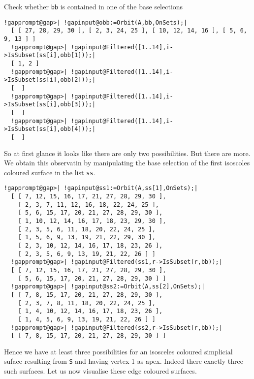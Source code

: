 \documentclass[a4paper,11pt]{report}
\begin{document}
{{ Check whether \texttt{bb} is contained in one of the base selections 

 
\begin{Verbatim}[commandchars=!@|,fontsize=\small,frame=single,label=Example]
  !gapprompt@gap>| !gapinput@obb:=Orbit(A,bb,OnSets);|
  [ [ 27, 28, 29, 30 ], [ 2, 3, 24, 25 ], [ 10, 12, 14, 16 ], [ 5, 6, 9, 13 ] ]
  !gapprompt@gap>| !gapinput@Filtered([1..14],i->IsSubset(ss[i],obb[1]));|
  [ 1, 2 ]
  !gapprompt@gap>| !gapinput@Filtered([1..14],i->IsSubset(ss[i],obb[2]));|
  [  ]
  !gapprompt@gap>| !gapinput@Filtered([1..14],i->IsSubset(ss[i],obb[3]));|
  [  ]
  !gapprompt@gap>| !gapinput@Filtered([1..14],i->IsSubset(ss[i],obb[4]));|
  [  ]
\end{Verbatim}
 

 So at first glance it looks like there are only two possibilities. But there
are more. We obtain this observatin by manipulating the base selection of the
first isoscoles coloured surface in the list \texttt{ss}. 

 
\begin{Verbatim}[commandchars=!@|,fontsize=\small,frame=single,label=Example]
  !gapprompt@gap>| !gapinput@ss1:=Orbit(A,ss[1],OnSets);|
  [ [ 7, 12, 15, 16, 17, 21, 27, 28, 29, 30 ], 
    [ 2, 3, 7, 11, 12, 16, 18, 22, 24, 25 ], 
    [ 5, 6, 15, 17, 20, 21, 27, 28, 29, 30 ], 
    [ 1, 10, 12, 14, 16, 17, 18, 23, 29, 30 ], 
    [ 2, 3, 5, 6, 11, 18, 20, 22, 24, 25 ], 
    [ 1, 5, 6, 9, 13, 19, 21, 22, 29, 30 ], 
    [ 2, 3, 10, 12, 14, 16, 17, 18, 23, 26 ], 
    [ 2, 3, 5, 6, 9, 13, 19, 21, 22, 26 ] ]
  !gapprompt@gap>| !gapinput@Filtered(ss1,r->IsSubset(r,bb));|
  [ [ 7, 12, 15, 16, 17, 21, 27, 28, 29, 30 ], 
    [ 5, 6, 15, 17, 20, 21, 27, 28, 29, 30 ] ]
  !gapprompt@gap>| !gapinput@ss2:=Orbit(A,ss[2],OnSets);|
  [ [ 7, 8, 15, 17, 20, 21, 27, 28, 29, 30 ], 
    [ 2, 3, 7, 8, 11, 18, 20, 22, 24, 25 ], 
    [ 1, 4, 10, 12, 14, 16, 17, 18, 23, 26 ], 
    [ 1, 4, 5, 6, 9, 13, 19, 21, 22, 26 ] ]
  !gapprompt@gap>| !gapinput@Filtered(ss2,r->IsSubset(r,bb));|
  [ [ 7, 8, 15, 17, 20, 21, 27, 28, 29, 30 ] ]
\end{Verbatim}
 

 Hence we have at least three possibilities for an isosceles coloured
simplicial suface resulting from \texttt{S} and having vertex 1 as apex. Indeed there exactly three such surfaces. Let us
now visualise these edge coloured surfaces. 

}}
\end{document}
